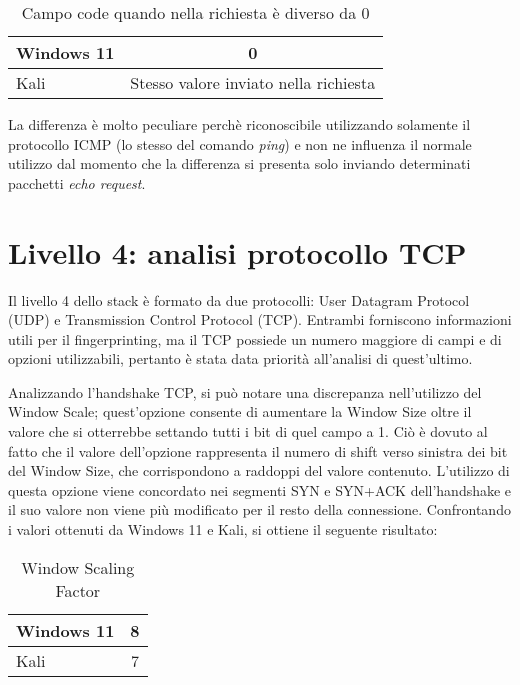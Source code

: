 \begin{table}[h]
	\centering
	\begin{tabular}{ | l | c |}
		\hline
		\rowcolor{blue!10} Windows 11 & 0
		\\
		\hline
		\rowcolor{red!10} Kali & Stesso valore inviato nella richiesta
		\\
		\hline

	\end{tabular}
	\caption{Campo code quando nella richiesta è diverso da 0}
	\label{tab:code}
\end{table}

La differenza è molto peculiare perchè riconoscibile utilizzando solamente il protocollo ICMP (lo stesso del comando \textit{ping}) e non ne influenza il normale utilizzo dal momento che la differenza si presenta solo inviando determinati pacchetti \textit{echo request}.
\section{Livello 4: analisi protocollo TCP}
Il livello 4 dello stack è formato da due protocolli: User Datagram Protocol (UDP) e Transmission Control Protocol (TCP). Entrambi forniscono informazioni utili per il fingerprinting, ma il TCP possiede un numero maggiore di campi e di opzioni utilizzabili, pertanto è stata data priorità all'analisi di quest'ultimo.

Analizzando l'handshake TCP, si può notare una discrepanza nell'utilizzo del Window Scale; quest'opzione consente di aumentare la Window Size oltre il valore che si otterrebbe settando tutti i bit di quel campo a 1.
Ciò è dovuto al fatto che il valore dell'opzione rappresenta il numero di shift verso sinistra dei bit del Window Size, che corrispondono a raddoppi del valore contenuto. 
L'utilizzo di questa opzione viene concordato nei segmenti SYN e SYN+ACK dell'handshake e il suo valore non viene più modificato per il resto della connessione. Confrontando i valori ottenuti da Windows 11 e Kali, si ottiene il seguente risultato:
\\
\begin{table}[htb]
	\centering
	\begin{tabular}{| l | c |}
		\hline
		\rowcolor{blue!10} Windows 11 & 8
		\\
		\hline
		\rowcolor{red!10} Kali & 7
		\\
		\hline
		
	\end{tabular}
	\caption{Window Scaling Factor}
	\label{tab:Window Scale}
\end{table}

